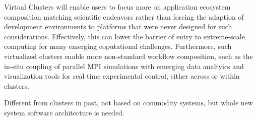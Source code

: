 Virtual Clusters will enable users to focus more on application ecosystem composition matching scientific endeavors rather than forcing the adaption of development environments to platforms that were never designed for such considerations.  Effectively, this can lower the barrier of entry to extreme-scale computing for many emerging coputational challenges.  Furthermore, such virtualized clusters enable more non-standard workflow composition, such as the in-situ coupling of parallel MPI simulations with emerging data analtyics and visualization tools for real-time experimental control, either across or within clusters. 


Different from clusters in past, not based on commodity systems, but whole new system software architecture is needed.



